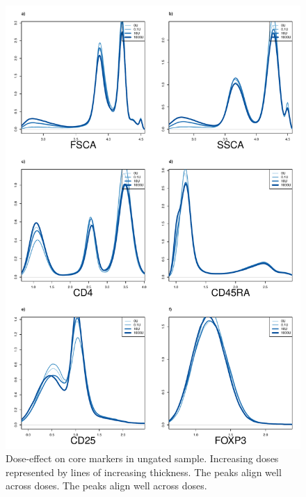 \hspace{-2cm}
\begin{figure}[h]
\centering
\includegraphics[scale=.3]{IL2/figures/dose-effect.pdf}
{Dose-effect on core markers in ungated sample.}
{
Increasing doses represented by lines of increasing thickness.
The peaks align well across doses.
The peaks align well across doses.
}
\end{figure}

